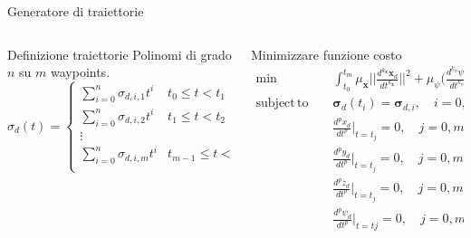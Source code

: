 \documentclass[]{beamer}
\DeclareMathOperator*{\subjectto}{subject\hspace{2pt}to}
\begin{document}
	\begin{frame}{Generatore di traiettorie}
		\centering
		\begin{columns}
			\begin{column}{.5\textwidth}
				\centering
				\begin{block}{Definizione traiettorie}
					Polinomi di grado $n$ su $m$ waypoints.
					\footnotesize
					\begin{equation*}
						\sigma_d(t)=
						\begin{cases}
							\sum\limits_{i=0}^{n}\sigma_{d,i,1}t^i & t_0 \le t < t_1 \\
							\sum\limits_{i=0}^{n}\sigma_{d,i,2}t^i & t_1 \le t < t_2 \\
							\vdots \\
							\sum\limits_{i=0}^{n}\sigma_{d,i,m}t^i & t_{m-1} \le t < t_m \\
						\end{cases}
					\end{equation*}
				\end{block}
			\end{column}
			\begin{column}{.5\textwidth}
				\centering
				Minimizzare funzione costo
				\tiny
				\begin{alignat}{3}
					\min\qquad & \int_{t_0}^{t_m}\mu_{\mathbf{x}} \Bigg|\Bigg|\frac{d^{k_{\mathbf{x}}}\mathbf{x}_d}{dt^{k_{\mathbf{x}}}} \Bigg|\Bigg|^2 + \mu_{\psi}\Bigg(\frac{d^{k_{\psi}}\psi_d}{dt^{k_{\psi}}}\Bigg)^2dt \nonumber \\
					\subjectto\qquad & \boldsymbol{\sigma}_d(t_i) = \boldsymbol{\sigma}_{d,i}, \quad i=0,\dots ,m \nonumber \\
					& \frac{d^px_d}{dt^p}\Big|_{t=t_j}=0, \quad j=0,m; \quad p=1,\dots ,k_r \nonumber \\
					& \frac{d^py_d}{dt^p}\Big|_{t=t_j}=0, \quad j=0,m; \quad p=1,\dots ,k_r \nonumber \\
					& \frac{d^pz_d}{dt^p}\Big|_{t=t_j}=0, \quad j=0,m; \quad p=1,\dots ,k_r \nonumber \\
					& \frac{d^p\psi_d}{dt^p}\Big|_{t=tj}=0, \quad j=0,m; \quad p=1,\dots ,k_{\psi} \nonumber
				\end{alignat}
			\end{column}
		\end{columns} 		
	\end{frame}
	
\end{document}
